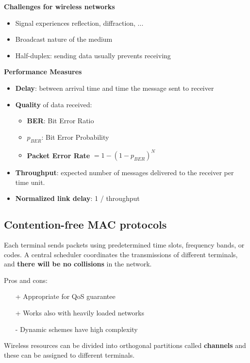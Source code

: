 \textbf{Challenges for wireless networks}
\begin{itemize}
	\item Signal experiences reflection, diffraction, ...
	\item Broadcast nature of the medium
	\item Half-duplex: sending data usually prevents receiving
\end{itemize}

\textbf{Performance Measures}
\begin{itemize}
	\item \textbf{Delay}: between arrival time and time the message sent to receiver
	\item \textbf{Quality} of data received: 
	\begin{itemize}
		\item \textbf{BER}: Bit Error Ratio
		\item \textbf{$p_{BER}$}: Bit Error Probability
		\item \textbf{Packet Error Rate} $= 1 - (1 - p_{BER})^N$ 
	\end{itemize}
	\item \textbf{Throughput}: expected number of messages delivered to the receiver per time unit.
	\item \textbf{Normalized link delay}: 1 / throughput
\end{itemize}


\subsection{Contention-free MAC protocols}
Each terminal sends packets using predetermined time slots, frequency bands, or codes. A central scheduler coordinates the transmissions of different terminals, and \textbf{there will be no collisions} in the network.

\begin{notImportant}
	Pros and cons:
	\begin{itemize}
		\item[+] Appropriate for QoS guarantee
		\item[+] Works also with heavily loaded networks
		\item[-] Dynamic schemes have high complexity
	\end{itemize}
	Wireless resources can be divided into orthogonal partitions called \textbf{channels} and these can be assigned to different terminals.
\end{notImportant}

